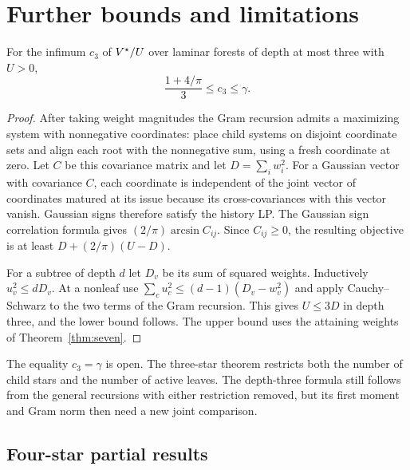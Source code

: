 \section{Further bounds and limitations}

\begin{proposition}\label{prop:c3}
For the infimum $c_3$ of $V^\star/U$ over laminar forests of depth at
most three with $U>0$,
\[
 \frac{1+4/\pi}{3}\le c_3\le\gamma .
\]
\end{proposition}
\begin{proof}
After taking weight magnitudes the Gram recursion admits a maximizing
system with nonnegative coordinates: place child systems on disjoint
coordinate sets and align each root with the nonnegative sum, using
a fresh coordinate at zero. Let $C$ be this covariance matrix and let
$D=\sum_iw_i^2$. For a Gaussian vector with covariance $C$, each
coordinate is independent of the joint vector of coordinates matured
at its issue because its cross-covariances with this vector vanish.
Gaussian signs therefore satisfy the history LP. The Gaussian sign
correlation formula gives $(2/\pi)\arcsin C_{ij}$. Since $C_{ij}\ge0$,
the resulting objective is at least $D+(2/\pi)(U-D)$.

For a subtree of depth $d$ let $D_v$ be its sum of squared weights.
Inductively $u_v^2\le dD_v$. At a nonleaf use
$\sum_c u_c^2\le(d-1)(D_v-w_v^2)$ and apply
Cauchy--Schwarz to the two terms of the Gram recursion. This gives
$U\le3D$ in depth three, and the lower bound follows. The upper bound
uses the attaining weights of Theorem~\ref{thm:seven}.
\end{proof}

The equality $c_3=\gamma$ is open. The three-star theorem restricts
both the number of child stars and the number of active leaves.
The depth-three formula still follows from the general recursions
with either restriction removed, but its first moment and Gram norm
then need a new joint comparison.

\subsection{Four-star partial results}

